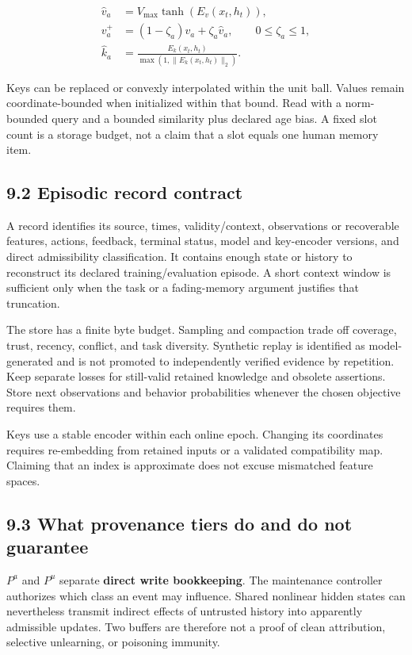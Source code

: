 \documentclass[
  11pt,
  a4paper,
]{article}
\begin{document}
\[
\begin{aligned}
\widehat v_a&=V_{\max}\tanh(E_v(x_t,h_t)),\\
v_a^+&=(1-\zeta_a)v_a+\zeta_a\widehat v_a,
\qquad0\le\zeta_a\le1,\\
\widehat k_a&=\frac{E_k(x_t,h_t)}{\max(1,\|E_k(x_t,h_t)\|_2)}.
\end{aligned}
\tag{26}
\]

Keys can be replaced or convexly interpolated within the unit ball.
Values remain coordinate-bounded when initialized within that bound.
Read with a norm-bounded query and a bounded similarity plus declared
age bias. A fixed slot count is a storage budget, not a claim that a
slot equals one human memory item.

\subsection{9.2 Episodic record
contract}\label{episodic-record-contract}

A record identifies its source, times, validity/context, observations or
recoverable features, actions, feedback, terminal status, model and
key-encoder versions, and direct admissibility classification. It
contains enough state or history to reconstruct its declared
training/evaluation episode. A short context window is sufficient only
when the task or a fading-memory argument justifies that truncation.

The store has a finite byte budget. Sampling and compaction trade off
coverage, trust, recency, conflict, and task diversity. Synthetic replay
is identified as model-generated and is not promoted to independently
verified evidence by repetition. Keep separate losses for still-valid
retained knowledge and obsolete assertions. Store next observations and
behavior probabilities whenever the chosen objective requires them.

Keys use a stable encoder within each online epoch. Changing its
coordinates requires re-embedding from retained inputs or a validated
compatibility map. Claiming that an index is approximate does not excuse
mismatched feature spaces.

\subsection{9.3 What provenance tiers do and do not
guarantee}\label{what-provenance-tiers-do-and-do-not-guarantee}

\(P^a\) and \(P^u\) separate \textbf{direct write bookkeeping}. The
maintenance controller authorizes which class an event may influence.
Shared nonlinear hidden states can nevertheless transmit indirect
effects of untrusted history into apparently admissible updates. Two
buffers are therefore not a proof of clean attribution, selective
unlearning, or poisoning immunity.
\end{document}
